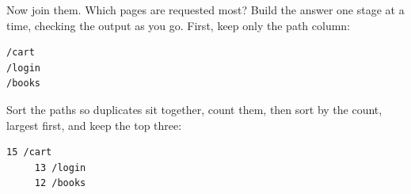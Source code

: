 Now join them. Which pages are requested most? Build the answer one stage at a time, checking the output as you go. First, keep only the path column:

\begin{codeblock}

\begin{Shaded}
\begin{Highlighting}[]
 \StringTok{\textquotesingle{} \textquotesingle{}} \KeywordTok{|}  
\end{Highlighting}
\end{Shaded}

\end{codeblock}

\begin{codeblock}
\begin{Verbatim}[formatcom=\outputstyle]
/cart
/login
/books
\end{Verbatim}
\end{codeblock}


Sort the paths so duplicates sit together, count them, then sort by the count, largest first, and keep the top three:

\begin{codeblock}

\begin{Shaded}
\begin{Highlighting}[]
 \StringTok{\textquotesingle{} \textquotesingle{}} \KeywordTok{|}  \KeywordTok{|}   \KeywordTok{|}   \KeywordTok{|}  
\end{Highlighting}
\end{Shaded}

\end{codeblock}

\begin{codeblock}
\begin{Verbatim}[formatcom=\outputstyle]
     15 /cart
     13 /login
     12 /books
\end{Verbatim}
\end{codeblock}


